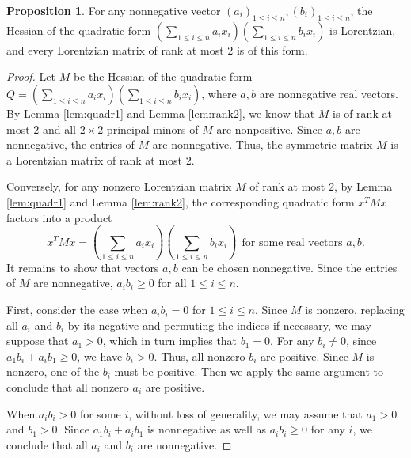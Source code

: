 \documentclass{amsart}
\theoremstyle{definition}
\newtheorem{proposition}[theorem]{Proposition}
\theoremstyle{remark}
\begin{document}
\begin{proposition}
For any nonnegative vector $(a_i)_{1 \le i \le n}, (b_i)_{1 \le i \le n}$, the Hessian of the quadratic form $\left(\sum_{1\leq i\leq n}a_ix_i\right)\left(\sum_{1\leq i\leq n}b_ix_i\right)$ is Lorentzian, and every Lorentzian matrix of rank at most $2$ is of this form.
\end{proposition}

\begin{proof}
Let $M$ be the Hessian of the quadratic form  $Q=\left(\sum_{1\leq i\leq n}a_ix_i\right)\left(\sum_{1\leq i\leq n}b_ix_i\right)$, where $a,b$ are nonnegative real vectors. 
By Lemma \ref{lem:quadr1} and Lemma \ref{lem:rank2}, we know that $M$ is of rank at most $2$ and all $2\times2$ principal minors of $M$ are nonpositive. Since $a,b$ are nonnegative, the entries of $M$ are nonnegative. Thus, the symmetric matrix $M$ is a Lorentzian matrix of rank at most $2$.

Conversely, for any nonzero Lorentzian matrix $M$ of rank at most $2$, by Lemma \ref{lem:quadr1} and Lemma \ref{lem:rank2}, the corresponding quadratic form $x^{T}Mx$ factors into a product 
\[x^{T}Mx=\left(\sum_{1\leq i\leq n}a_ix_i\right)\left(\sum_{1\leq i\leq n}b_ix_i\right) \ \ \text{for some real vectors $a,b$.}\]  
It remains to show that vectors $a,b$ can be chosen nonnegative. Since the entries of $M$ are nonnegative, $a_ib_i\geq 0$ for all $1\leq i\leq n$. %

First, consider the case when $a_ib_i=0$ for $1\leq i\leq n$. Since $M$ is nonzero, replacing all $a_i$ and $b_i$ by its negative and permuting the indices if necessary, we may suppose that $a_1>0$, which in turn implies that $b_1=0$. For any $b_i\neq 0$, since $a_1b_i+a_ib_1\geq0$, we have $b_i>0$. Thus, all nonzero $b_i$ are positive. Since $M$ is nonzero, one of the $b_i$ must be positive. Then we apply the same argument to conclude that all nonzero $a_i$ are positive. 

When $a_ib_i> 0$ for some $i$, without loss of generality, we may assume that $a_1>0$ and $b_1>0$. Since $a_1b_i+a_ib_1$ is nonnegative as well as $a_ib_i\geq0$ for any $i$, we conclude that all $a_i$ and $b_i$ are nonnegative. 
\end{proof}
\end{document}
